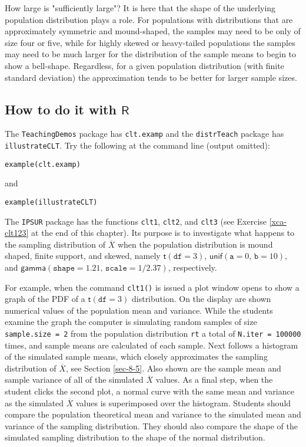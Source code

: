 \begin{rem}
How large is "sufficiently large"? It is here that the shape of the
underlying population distribution plays a role. For populations with
distributions that are approximately symmetric and mound-shaped, the
samples may need to be only of size four or five, while for highly
skewed or heavy-tailed populations the samples may need to be much
larger for the distribution of the sample means to begin to show a
bell-shape. Regardless, for a given population distribution (with
finite standard deviation) the approximation tends to be better for
larger sample sizes.
\end{rem}

\subsection{How to do it with \(\mathsf{R}\)}
\label{sec-8-3-1}

The \texttt{TeachingDemos} package \cite{TeachingDemos} has \texttt{clt.examp} and
the \texttt{distrTeach} \cite{distrTeach} package has \texttt{illustrateCLT}. Try
the following at the command line (output omitted):
\begin{verbatim}
example(clt.examp)
\end{verbatim}
and
\begin{verbatim}
example(illustrateCLT)
\end{verbatim}

The \texttt{IPSUR} package \cite{IPSUR} has the functions \texttt{clt1}, \texttt{clt2}, and
\texttt{clt3} (see Exercise \ref{xca-clt123} at the end of this chapter). Its purpose
is to investigate what happens to the sampling distribution of
\(\overline{X}\) when the population distribution is mound shaped,
finite support, and skewed, namely \(\mathsf{t}(\mathtt{df}=3)\),
\(\mathsf{unif}(\mathtt{a}=0,\,\mathtt{b}=10)\), and
\(\mathsf{gamma}(\mathtt{shape}=1.21,\,\mathtt{scale}=1/2.37)\),
respectively.

For example, when the command \texttt{clt1()} is issued a plot window opens
to show a graph of the PDF of a \(\mathsf{t}(\mathtt{df}=3)\)
distribution. On the display are shown numerical values of the
population mean and variance. While the students examine the graph the
computer is simulating random samples of size \texttt{sample.size = 2} from
the population distribution \texttt{rt} a total of \texttt{N.iter = 100000} times,
and sample means are calculated of each sample. Next follows a
histogram of the simulated sample means, which closely approximates
the sampling distribution of \(\overline{X}\), see Section
\ref{sec-8-5}. Also shown are the sample
mean and sample variance of all of the simulated \( \overline{X} \)
values. As a final step, when the student clicks the second plot, a
normal curve with the same mean and variance as the simulated \(
\overline{X} \) values is superimposed over the histogram. Students
should compare the population theoretical mean and variance to the
simulated mean and variance of the sampling distribution. They should
also compare the shape of the simulated sampling distribution to the
shape of the normal distribution.

